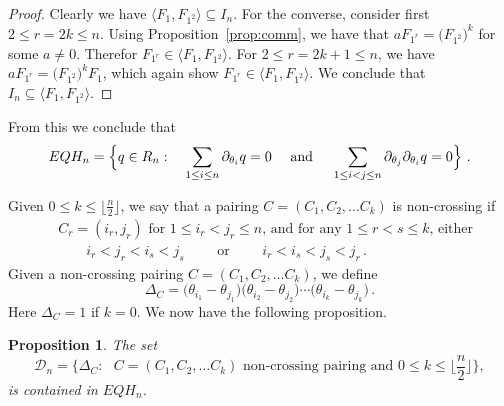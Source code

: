 \documentclass[11pt]{amsart}
\newtheorem{prop}[theorem]{Proposition}
\theoremstyle{definition}
\numberwithin{equation}{section}
\begin{document}
\begin{proof} Clearly we have $ \langle F_1, F_{1^2}  \rangle \subseteq I_n$. For the  converse, consider first $2\le r=2k\le n$. Using Proposition~\ref{prop:comm}, we have that
$aF_{1^r} = \big(F_{1^2}\big)^k$ for some $a\ne 0$. Therefor $F_{1^r} \in \langle F_1, F_{1^2}  \rangle$. For $2\le r=2k+1\le n$, we have $aF_{1^r} = \big(F_{1^2}\big)^kF_1$, which again show $F_{1^r} \in \langle F_1, F_{1^2}  \rangle$. We conclude that $I_n\subseteq  \langle F_1, F_{1^2}  \rangle$. 
\end{proof}
From this we conclude that 
\begin{equation}\label{eq:defEQH}
EQH_n =  \Big\{ q \in R_n :  \quad\sum_{1\le i\le n} \partial_{\theta_i}q= 0 \quad\hbox{ and  }\quad \sum_{1\le i<j\le n} \partial_{\theta_j}\partial_{\theta_i}q= 0 \Big\}~.
\end{equation}

Given $0\le k\le \lfloor \frac{n}{2}\rfloor$, we say that a pairing $C=(C_1,C_2,\ldots C_k)$ is non-crossing if
\begin{align*}
 &C_r=(i_r,j_r) \text{ for $1\le i_r<j_r\le n$,}\text{ and for any $1\le r<s\le k$, either}\\	
 &\qquad i_r<j_r<i_s<j_s \qquad \text{ or }\qquad  i_r<i_s<j_s<j_r\,. 
\end{align*}
Given a non-crossing pairing $C=(C_1,C_2,\ldots C_k)$, we define
  $$\Delta_C = \big(\theta_{i_1}-\theta_{j_1}\big)\big(\theta_{i_2}-\theta_{j_2}\big)\cdots \big(\theta_{i_k}-\theta_{j_k}\big)\,.
  $$
Here $\Delta_C=1$ if $k=0$. We now have the following proposition.

\begin{prop}\label{harmbasis}
The set
$${\mathcal D}_n =\big\{ \Delta_C: \text{ $C=(C_1,C_2,\ldots C_k)$  non-crossing pairing and $0\le k\le \lfloor \frac{n}{2}\rfloor$}\big\},
$$
is contained in $EQH_n $.
\end{prop}
\end{document}
